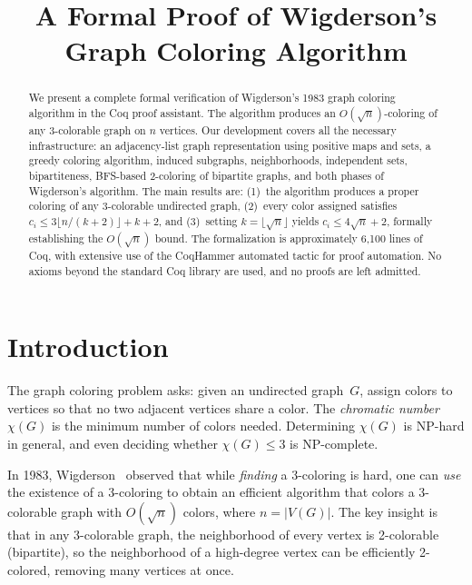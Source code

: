 \documentclass[11pt]{article}
\title{A Formal Proof of Wigderson's Graph Coloring Algorithm}
\author{}
\date{}
\theoremstyle{plain}
\theoremstyle{definition}
\theoremstyle{remark}
\begin{document}
\maketitle

\begin{abstract}
We present a complete formal verification of Wigderson's 1983 graph coloring algorithm in the Coq proof assistant.
The algorithm produces an $O(\!\sqrt{n})$-coloring of any 3-colorable graph on $n$ vertices.
Our development covers all the necessary infrastructure: an adjacency-list graph representation using positive maps and sets,
a greedy coloring algorithm, induced subgraphs, neighborhoods, independent sets, bipartiteness,
BFS-based 2-coloring of bipartite graphs, and both phases of Wigderson's algorithm.
The main results are: (1)~the algorithm produces a proper coloring of any 3-colorable undirected graph, (2)~every color assigned satisfies $c_i \le 3\lfloor n/(k{+}2)\rfloor + k + 2$, and (3)~setting $k = \lfloor\!\sqrt{n}\rfloor$ yields $c_i \le 4\sqrt{n} + 2$, formally establishing the $O(\!\sqrt{n})$ bound.
The formalization is approximately 6{,}100 lines of Coq, with extensive use of the CoqHammer automated tactic for proof automation.
No axioms beyond the standard Coq library are used, and no proofs are left admitted.
\end{abstract}

\section{Introduction}
\label{sec:intro}

The graph coloring problem asks: given an undirected graph~$G$, assign colors to vertices so that no two adjacent vertices share a color.
The \emph{chromatic number}~$\chi(G)$ is the minimum number of colors needed.
Determining $\chi(G)$ is NP-hard in general, and even deciding whether $\chi(G) \le 3$ is NP-complete.

In 1983, Wigderson~\cite{wigderson83} observed that while \emph{finding} a 3-coloring is hard,
one can \emph{use} the existence of a 3-coloring to obtain an efficient algorithm that colors a 3-colorable graph
with $O(\!\sqrt{n})$ colors, where $n = |V(G)|$.
The key insight is that in any 3-colorable graph, the neighborhood of every vertex is 2-colorable (bipartite),
so the neighborhood of a high-degree vertex can be efficiently 2-colored, removing many vertices at once.
\end{document}
